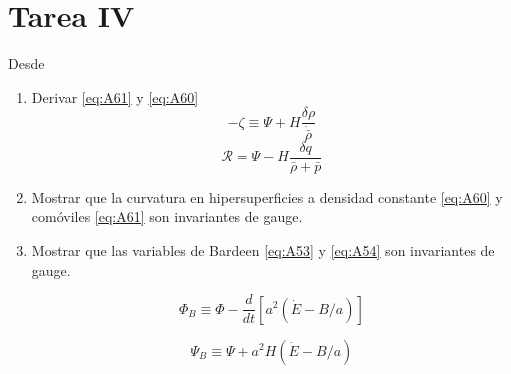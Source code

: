 \documentclass[a4paper]{article}
\begin{document}
\section{Tarea IV}

Desde \cite{BaumannTASI2024}

\begin{enumerate}
	\item Derivar \eqref{eq:A61} y \eqref{eq:A60}
\begin{equation}
-\zeta \equiv \Psi + H \frac{\delta\rho}{\dot{\bar{\rho}}}
\tag{A.60}
\label{eq:A60}
\end{equation}
\begin{equation}
\mathcal{R} = \Psi - H \frac{\delta q}{\bar{\rho} + \bar{p}}
\tag{A.61}
\label{eq:A61}
\end{equation}

	\item Mostrar que la curvatura en hipersuperficies a densidad constante \eqref{eq:A60} y comóviles \eqref{eq:A61} son invariantes de gauge.
	\item Mostrar que las variables de Bardeen \eqref{eq:A53} y \eqref{eq:A54} son invariantes de gauge.
	
\begin{equation}
\Phi_B \equiv \Phi - \frac{d}{dt} [a^2(\dot{E} - B/a)]
\tag{A.53}
\label{eq:A53}
\end{equation}


\begin{equation}
\Psi_B \equiv \Psi + a^2 H(\dot{E} - B/a)
\tag{A.54}
\label{eq:A54}
\end{equation}

\end{enumerate}
\end{document}
